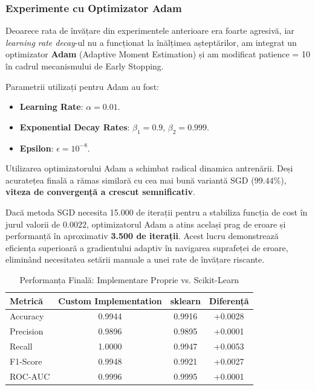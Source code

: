 \documentclass[12pt,a4paper]{article}
\begin{document}
\subsubsection*{Experimente cu Optimizator Adam}

Deoarece rata de învățare din experimentele anterioare era foarte agresivă, iar \textit{learning rate decay}-ul nu a funcționat la înălțimea așteptărilor, am integrat un optimizator \textbf{Adam} (Adaptive Moment Estimation) și am modificat patience = 10 în cadrul mecanismului de Early Stopping.

Parametrii utilizați pentru Adam au fost:
\begin{itemize}
    \item \textbf{Learning Rate}: $\alpha = 0.01$.
    \item \textbf{Exponential Decay Rates}: $\beta_1 = 0.9$, $\beta_2 = 0.999$.
    \item \textbf{Epsilon}: $\epsilon = 10^{-8}$.
\end{itemize}

Utilizarea optimizatorului Adam a schimbat radical dinamica antrenării. Deși acuratețea finală a rămas similară cu cea mai bună variantă SGD ($99.44\%$), \textbf{viteza de convergență a crescut semnificativ}. 

Dacă metoda SGD necesita 15.000 de iterații pentru a stabiliza funcția de cost în jurul valorii de $0.0022$, optimizatorul Adam a atins același prag de eroare și performanță în aproximativ \textbf{3.500 de iterații}. Acest lucru demonstrează eficiența superioară a gradientului adaptiv în navigarea suprafeței de eroare, eliminând necesitatea setării manuale a unei rate de învățare riscante.

\begin{table}[h]
    \centering
    \caption{Performanța Finală: Implementare Proprie vs. Scikit-Learn}
    \vspace{0.2cm}
    \begin{tabular}{lccc}
        \toprule
        \textbf{Metrică} & \textbf{Custom Implementation} & \textbf{sklearn} & \textbf{Diferență} \\
        \midrule
        Accuracy & 0.9944 & 0.9916 & +0.0028 \\
        Precision & 0.9896 & 0.9895 & +0.0001 \\
        Recall & 1.0000 & 0.9947 & +0.0053 \\
        F1-Score & 0.9948 & 0.9921 & +0.0027 \\
        ROC-AUC & 0.9996 & 0.9995 & +0.0001 \\
        \bottomrule
    \end{tabular}
\end{table}
 \newpage
\end{document}
